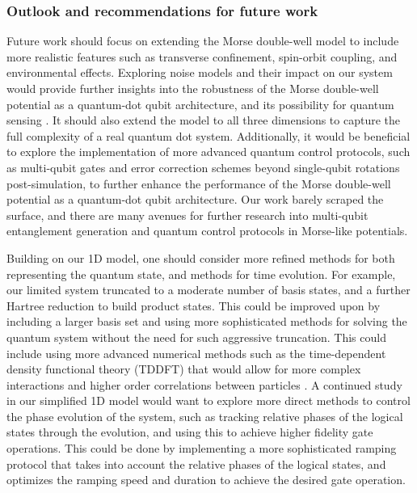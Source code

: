 \documentclass{subfiles}
\begin{document}
\subsubsection*{Outlook and recommendations for future work}
Future work should focus on extending the Morse double-well model to include more realistic features such as transverse confinement, spin-orbit coupling, and environmental effects. Exploring noise models and their impact on our system would provide further insights into the robustness of the Morse double-well potential as a quantum-dot qubit architecture, and its possibility for quantum sensing \cite{kuhlmann2013charge, zhang2012quantum}. It should also extend the model to all three dimensions to capture the full complexity of a real quantum dot system. Additionally, it would be beneficial to explore the implementation of more advanced quantum control protocols, such as multi-qubit gates and error correction schemes beyond single-qubit rotations post-simulation, to further enhance the performance of the Morse double-well potential as a quantum-dot qubit architecture. Our work barely scraped the surface, and there are many avenues for further research into multi-qubit entanglement generation and quantum control protocols in Morse-like potentials. 

Building on our 1D model, one should consider more refined methods for both representing the quantum state, and methods for time evolution. For example, our limited system truncated to a moderate number of basis states, and a further Hartree reduction to build product states. This could be improved upon by including a larger basis set and using more sophisticated methods for solving the quantum system without the need for such aggressive truncation. This could include using more advanced numerical methods such as the time-dependent density functional theory (TDDFT) that would allow for more complex interactions and higher order correlations between particles \cite{car1985unified, hafner2008ab}. A continued study in our simplified 1D model would want to explore more direct methods to control the phase evolution of the system, such as tracking relative phases of the logical states through the evolution, and using this to achieve higher fidelity gate operations. This could be done by implementing a more sophisticated ramping protocol that takes into account the relative phases of the logical states, and optimizes the ramping speed and duration to achieve the desired gate operation.
\end{document}
